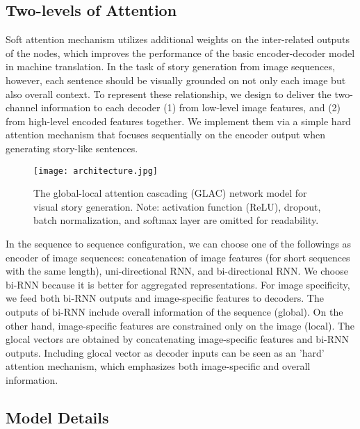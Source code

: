 \documentclass[11pt,a4paper]{article}
\begin{document}
\subsection{Two-levels of Attention}


Soft attention mechanism \cite{Bah2014nmt} utilizes additional weights on the inter-related outputs of the nodes, which improves the performance of the basic encoder-decoder model in machine translation.
In the task of story generation from image sequences, however, each sentence should be visually grounded on not only each image but also overall context.
To represent these relationship, we design to deliver the two-channel information to each decoder (1) from low-level image features, and (2) from high-level encoded features together.
We implement them via a simple hard attention mechanism that focuses sequentially on the encoder output when generating story-like sentences.


\begin{figure*}[h!] \centering
\texttt{[image: architecture.jpg]}
\caption{The global-local attention cascading (GLAC) network model for visual story generation. Note: activation function (ReLU), dropout, batch normalization, and softmax layer are omitted for readability.}
\label{fig:model}
\end{figure*}

In the sequence to sequence configuration, we can choose one of the followings as encoder of image sequences: concatenation of image features (for short sequences with the same length), uni-directional RNN, and bi-directional RNN.
We choose bi-RNN because it is better for aggregated representations. 
For image specificity, we feed both bi-RNN outputs and image-specific features to decoders.
The outputs of bi-RNN include overall information of the sequence (global).
On the other hand, image-specific features are constrained only on the image (local).
The glocal vectors are obtained by concatenating image-specific features and bi-RNN outputs.
Including glocal vector as decoder inputs can be seen as an 'hard' attention mechanism, which emphasizes both image-specific and overall information.













\subsection{Model Details}
\end{document}
